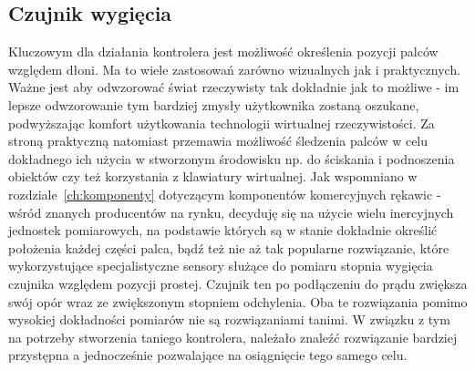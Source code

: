 	\subsection{Czujnik wygięcia}
	\label{subsec:wygiecie}	
	Kluczowym dla działania kontrolera jest możliwość określenia pozycji palców względem dłoni. Ma to wiele zastosowań zarówno wizualnych jak i praktycznych. Ważne jest aby odwzorować świat rzeczywisty tak dokładnie jak to możliwe - im lepsze odwzorowanie tym bardziej zmysły użytkownika zostaną oszukane, podwyższając komfort użytkowania technologii wirtualnej rzeczywistości. Za stroną praktyczną natomiast przemawia możliwość śledzenia palców w celu dokładnego ich użycia w stworzonym środowisku np. do ściskania i podnoszenia obiektów czy też korzystania z klawiatury wirtualnej. Jak wspomniano w rozdziale~\ref{ch:komponenty} dotyczącym komponentów komercyjnych rękawic - wśród znanych producentów na rynku, decyduję się na użycie wielu inercyjnych jednostek pomiarowych, na podstawie których są w stanie dokładnie określić położenia każdej części palca, bądź też nie aż tak popularne rozwiązanie, które wykorzystujące specjalistyczne sensory służące do pomiaru stopnia wygięcia czujnika względem pozycji prostej.
Czujnik ten po podłączeniu do prądu zwiększa swój opór wraz ze zwiększonym stopniem odchylenia. Oba te rozwiązania pomimo wysokiej dokładności pomiarów nie są rozwiązaniami tanimi. W związku z tym na potrzeby stworzenia taniego kontrolera, należało znaleźć rozwiązanie bardziej przystępna a jednocześnie pozwalające na osiągnięcie tego samego celu.
	

